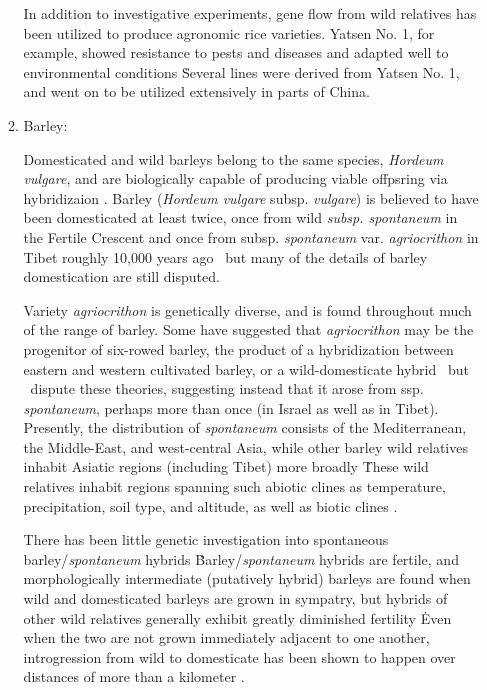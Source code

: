 \documentclass[11pt]{article}
\begin{document}
\begin{enumerate}
\begin{enumerate}
In addition to investigative experiments, gene flow from wild relatives has been utilized to produce agronomic rice varieties.
Yatsen No. 1, for example, showed resistance to pests and diseases and adapted well to environmental conditions \cite{ting1933wild}\.
Several lines were derived from Yatsen No. 1, and went on to be utilized extensively in parts of China.





		
	

\item{Barley:}
		
Domesticated and wild barleys belong to the same species, \emph{Hordeum vulgare}, and are biologically capable of producing viable offpsring via hybridizaion \cite{von1995ecographical}.
Barley (\emph{Hordeum vulgare} subsp. \emph{vulgare}) is believed to have been domesticated at least twice, once from wild \emph{subsp. spontaneum} in the Fertile Crescent and once from subsp. \emph{spontaneum} var. \emph{agriocrithon} in Tibet roughly 10,000 years ago \cite{takahashi1955origin, badr2000origin, oka2012origin, azhaguvel2007phylogenetic, haberer2015barley}\, but many of the details of barley domestication are still disputed.


Variety \emph{agriocrithon} is genetically diverse, and is found throughout much of the range of barley.
Some have suggested that \emph{agriocrithon} may be the progenitor of six-rowed barley, the product of a hybridization between eastern and western cultivated barley, or a wild-domesticate hybrid \cite{staudt1961origin, zohary1959hordeum, murphy1982origin}\, but \cite{azhaguvel2007phylogenetic}\ dispute these theories, suggesting instead that it arose from ssp. \emph{spontaneum}, perhaps more than once (in Israel as well as in Tibet).
Presently, the distribution of \emph{spontaneum} consists of the Mediterranean, the Middle-East, and west-central Asia, while other barley wild relatives inhabit Asiatic regions (including Tibet) more broadly \cite{nevo2010drought, harlan1995living, CWR}\.
These wild relatives inhabit regions spanning such abiotic clines as temperature, precipitation, soil type, and altitude, as well as biotic clines \cite{nevo2010drought}.


There has been little genetic investigation into spontaneous barley/\emph{spontaneum} hybrids \cite{ellstrand2003dangerous}\.
Barley/\emph{spontaneum} hybrids are fertile, and morphologically intermediate (putatively hybrid) barleys are found when wild and domesticated barleys are grown in sympatry, but hybrids of other wild relatives generally exhibit greatly diminished fertility \cite{ellstrand2003dangerous, harlan1995living}\.
Even when the two are not grown immediately adjacent to one another, introgression from wild to domesticate has been shown to happen over distances of more than a kilometer \cite{hillman2001new}.



\end{enumerate}
\end{enumerate}
\end{document}
